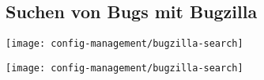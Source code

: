 \subsection{Suchen von Bugs mit Bugzilla}
\ifslides
\begin{center}
\texttt{[image: config-management/bugzilla-search]}
\end{center}
\else
\texttt{[image: config-management/bugzilla-search]}
\fi

